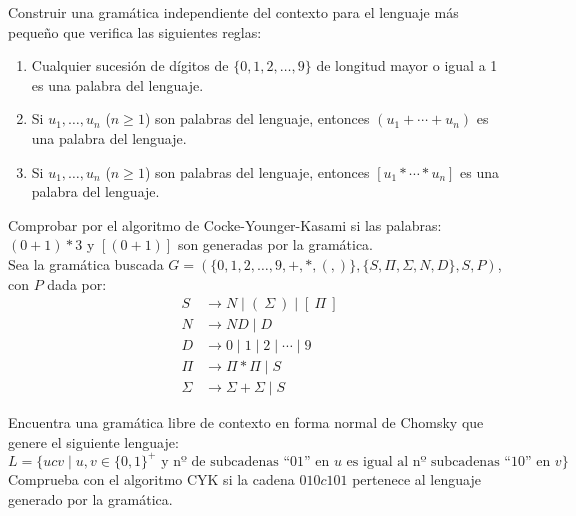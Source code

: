 \begin{ejercicio}\label{ej:1.6.10}
    Construir una gramática independiente del contexto para el lenguaje más pequeño que verifica las siguientes reglas:
    \begin{enumerate}
        \item Cualquier sucesión de dígitos de $\{0,1,2,\ldots, 9\}$ de longitud mayor o igual a 1 es una palabra del lenguaje.
        \item Si $u_1,\ldots,u_n$ ($n\geq 1$) son palabras del lenguaje, entonces $(u_1+\cdots + u_n)$ es una palabra del lenguaje.
        \item Si $u_1,\ldots,u_n$ ($n\geq 1$) son palabras del lenguaje, entonces $[u_1 \ast \cdots \ast u_n]$ es una palabra del lenguaje.
    \end{enumerate}
    Comprobar por el algoritmo de Cocke-Younger-Kasami si las palabras: $(0+1)*3$ y $[(0+1)]$ son generadas por la gramática.\\

    Sea la gramática buscada $G=(\{0,1,2,\ldots,9,+,\ast,(,)\},\{S,\Pi,\Sigma,N,D\},S,P)$, con $P$ dada por:
    \begin{align*}
        S &\rightarrow N \mid (~\Sigma~) \mid [~\Pi~] \\
        N &\rightarrow ND \mid D \\
        D &\rightarrow 0 \mid 1 \mid 2 \mid \cdots \mid 9 \\
        \Pi &\rightarrow \Pi \ast \Pi \mid S \\
        \Sigma &\rightarrow \Sigma + \Sigma \mid S
    \end{align*}

\end{ejercicio}

\begin{ejercicio}\label{ej:1.6.11}
    Encuentra una gramática libre de contexto en forma normal de Chomsky que genere el siguiente lenguaje:
    \begin{equation*}
        L = \{ucv \mid u,v\in {\{0,1\}}^{+} \text{\ y nº de subcadenas ``} 01 \text{'' en\ } u \text{\ es igual al nº subcadenas ``}10 \text{'' en\ }v\}
    \end{equation*}
    Comprueba con el algoritmo CYK si la cadena $010c101$ pertenece al lenguaje generado por la gramática.

\end{ejercicio}

